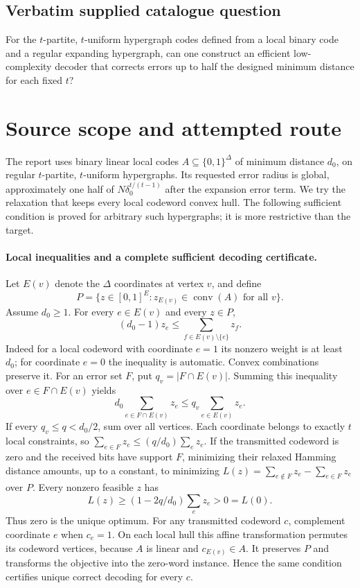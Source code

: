 \documentclass[11pt]{article}
\begin{document}
\subsection{Verbatim supplied catalogue question}
For the $t$-partite, $t$-uniform hypergraph codes defined from a local binary code and a regular expanding hypergraph, can one construct an efficient low-complexity decoder that corrects errors up to half the designed minimum distance for each fixed $t$?

\section{Source scope and attempted route}
The report uses binary linear local codes $A\subseteq\{0,1\}^{\Delta}$
of minimum distance $d_0$, on regular $t$-partite, $t$-uniform hypergraphs.
Its requested error radius is global, approximately one half of
$N\delta_0^{t/(t-1)}$ after the expansion error term. We try the relaxation
that keeps every local codeword convex hull. The following sufficient condition
is proved for arbitrary such hypergraphs; it is more restrictive than the target.

\paragraph{Local inequalities and a complete sufficient decoding certificate.}
Let $E(v)$ denote the $\Delta$ coordinates at vertex $v$, and define
\[
P=\{z\in[0,1]^E:z_{E(v)}\in\operatorname{conv}(A)\text{ for all }v\}.
\]
Assume $d_0\ge1$. For every $e\in E(v)$ and every $z\in P$,
\[
(d_0-1)z_e\le\sum_{f\in E(v)\setminus\{e\}}z_f.
\]
Indeed for a local codeword with coordinate $e=1$ its nonzero weight is
at least $d_0$; for coordinate $e=0$ the inequality is automatic. Convex
combinations preserve it. For an error set $F$, put $q_v=|F\cap E(v)|$.
Summing this inequality over $e\in F\cap E(v)$ yields
\[
d_0\sum_{e\in F\cap E(v)}z_e\le q_v\sum_{e\in E(v)}z_e.
\]
If every $q_v\le q<d_0/2$, sum over all vertices. Each coordinate belongs
to exactly $t$ local constraints, so
$\sum_{e\in F}z_e\le(q/d_0)\sum_ez_e$.
If the transmitted codeword is zero and the received bits have support $F$,
minimizing their relaxed Hamming distance amounts, up to a constant, to
minimizing $L(z)=\sum_{e\notin F}z_e-\sum_{e\in F}z_e$ over $P$.
Every nonzero feasible $z$ has
\[
L(z)\ge(1-2q/d_0)\sum_ez_e>0=L(0).
\]
Thus zero is the unique optimum. For any transmitted codeword $c$, complement
coordinate $e$ when $c_e=1$. On each local hull this affine transformation
permutes its codeword vertices, because $A$ is linear and $c_{E(v)}\in A$.
It preserves $P$ and transforms the objective into the zero-word instance.
Hence the same condition certifies unique correct decoding for every $c$.
\end{document}
